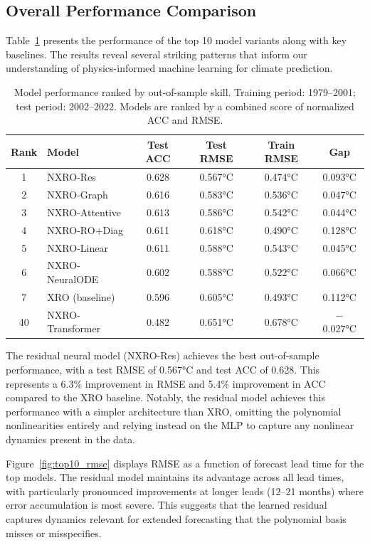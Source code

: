 \subsection{Overall Performance Comparison}

Table~\ref{tab:top10_outsample} presents the performance of the top 10 model variants along with key baselines. The results reveal several striking patterns that inform our understanding of physics-informed machine learning for climate prediction.

\begin{table}[htbp]
\centering
\caption{Model performance ranked by out-of-sample skill. Training period: 1979--2001; test period: 2002--2022. Models are ranked by a combined score of normalized ACC and RMSE.}
\label{tab:top10_outsample}
\begin{tabular}{clcccc}
\toprule
\textbf{Rank} & \textbf{Model} & \textbf{Test ACC} & \textbf{Test RMSE} & \textbf{Train RMSE} & \textbf{Gap} \\
\midrule
1 & NXRO-Res & 0.628 & 0.567°C & 0.474°C & 0.093°C \\
2 & NXRO-Graph & 0.616 & 0.583°C & 0.536°C & 0.047°C \\
3 & NXRO-Attentive & 0.613 & 0.586°C & 0.542°C & 0.044°C \\
4 & NXRO-RO+Diag & 0.611 & 0.618°C & 0.490°C & 0.128°C \\
5 & NXRO-Linear & 0.611 & 0.588°C & 0.543°C & 0.045°C \\
6 & NXRO-NeuralODE & 0.602 & 0.588°C & 0.522°C & 0.066°C \\
7 & XRO (baseline) & 0.596 & 0.605°C & 0.493°C & 0.112°C \\
\midrule
40 & NXRO-Transformer & 0.482 & 0.651°C & 0.678°C & $-$0.027°C \\
\bottomrule
\end{tabular}
\end{table}

The residual neural model (NXRO-Res) achieves the best out-of-sample performance, with a test RMSE of 0.567°C and test ACC of 0.628. This represents a 6.3\% improvement in RMSE and 5.4\% improvement in ACC compared to the XRO baseline. Notably, the residual model achieves this performance with a simpler architecture than XRO, omitting the polynomial nonlinearities entirely and relying instead on the MLP to capture any nonlinear dynamics present in the data.

Figure~\ref{fig:top10_rmse} displays RMSE as a function of forecast lead time for the top models. The residual model maintains its advantage across all lead times, with particularly pronounced improvements at longer leads (12--21 months) where error accumulation is most severe. This suggests that the learned residual captures dynamics relevant for extended forecasting that the polynomial basis misses or misspecifies.


